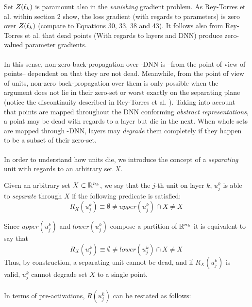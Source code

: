 Set $Z(\ell_k)$ is paramount also in the \emph{vanishing} gradient problem. As Rey-Torres et al. \cite{reyRiera2019ModellingClassificationReLU} within section 2 show, the loss gradient (with regards to parameters) is zero over $Z(\ell_k)$ (compare to Equations 30, 33, 38 and 43). It follows also from Rey-Torres et al.  \cite{reyRiera2019ModellingClassificationReLU} that dead points (With regards to layers and DNN) produce zero-valued parameter gradients. 
\\\\
In this sense, non-zero back-propagation over \ReLU-DNN is --from the point of view of points-- dependent on that they are not dead. Meanwhile, from the point of view of units, non-zero back-propagation over them is only possible when the argument does not lie in their zero-set or worst exactly on the separating plane (notice the discontinuity described in Rey-Torres et al. \cite{reyRiera2019ModellingClassificationReLU}). Taking into account that points are mapped throughout the DNN conforming \emph{abstract representations}, a point may be dead with regards to a layer but die in the next. When whole sets are mapped through \ReLU-DNN, layers may \emph{degrade} them completely if they happen to be a subset of their zero-set.  
\\\\
In order to understand how units die, we introduce the concept of a \emph{separating} unit with regards to an arbitrary set $X$. 
\begin{definition}\label{def:separatingUnit}
Given an arbitrary set $X\subset\mathbb{R}^{n_k}$, we say that the $j$-th unit on layer $k$, $u_j^k$ is able to \emph{separate} through $X$ if the following predicate is satisfied:
\begin{equation}\label{eq:predicateWithUpper}
    R_X(u_j^k)\equiv \emptyset \neq upper(u_j^k) \cap X \neq X 
\end{equation}
\end{definition}
Since $upper(u_j^k)$ and $lower(u_j^k)$ compose a partition of $\mathbb{R}^{n_k}$ it is equivalent to say that 
\begin{equation}\label{eq:predicateWithLower}
    R_X(u_j^k)\equiv \emptyset \neq lower(u_j^k) \cap X \neq X 
\end{equation}
Thus, by construction, a separating unit cannot be dead, and if $R_X(u_j^k)$ is valid, $u_j^k$ cannot degrade set $X$ to a single point. 
\\\\
In terms of pre-activations, $R(u_j^k)$ can be restated as follows:
